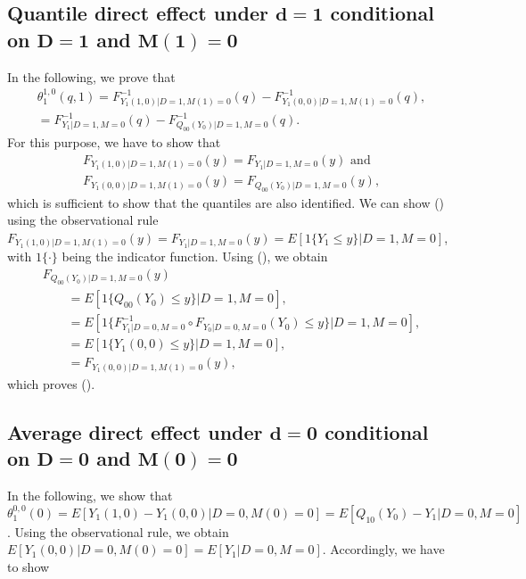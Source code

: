 \documentclass[a4paper,12pt]{article}
\begin{document}
 \doublespacing \pagestyle{plain}
\subsection{Quantile direct effect under $\mathbf{d=1}$ conditional on $\mathbf{D=1}$ and $\mathbf{M(1)=0}$}
In the following, we prove that
\begin{align*}\theta_1^{1,0}(q,1) = F_{Y_{1}(1,0)|D=1,M(1)=0}^{-1}(q)-F_{Y_{1}(0,0)|D=1,M(1)=0}^{-1}(q),\\= F_{Y_{1}|D=1,M=0}^{-1}(q)-F_{Q_{00}(Y_{0})|D=1,M=0}^{-1}(q).
\end{align*} For this purpose, we have to show that
\begin{align}
F_{Y_{1}(1,0)|D=1,M(1)=0}(y)   = F_{Y_{1}|D=1,M=0}(y) \mbox{ and}  \\
F_{Y_{1}(0,0)|D=1,M(1)=0} (y)  =F_{Q_{00}(Y_{0})|D=1,M=0}(y) ,
\end{align}
which is sufficient to show that the quantiles are also identified. We can show () using the observational rule $F_{Y_{1}(1,0)|D=1,M(1)=0}(y)= F_{Y_{1}|D=1,M=0}(y)= E[1\{Y_1 \leq y\} |D=1,M=0]$, with $1\{\cdot\}$ being the indicator function.
Using (), we obtain
\begin{equation}  \begin{array}{rl}
F_{Q_{00}(Y_{0})|D=1,M=0}(y)\\  \qquad = E[1\{Q_{00}(Y_0) \leq y \}|D=1,M=0],\\
\qquad =E[1\{ F_{Y_1|D=0,M=0}^{-1} \circ F_{Y_0|D=0,M=0}(Y_0 ) \leq y \} |D=1,M=0],\\
\qquad =E[1\{ Y_1(0,0)\leq y \}|D=1,M=0],\\ \qquad =F_{Y_{1}(0,0)|D=1,M(1)=0} (y), \end{array}
\end{equation}
which proves ().
\subsection{Average direct effect under $\mathbf{d=0}$ conditional on $\mathbf{D=0}$ and $\mathbf{M(0)=0}$}
In the following, we show that $\theta_1^{0,0}(0)= E[Y_1(1,0)-Y_1(0,0)|D=0,M(0)=0]=  E[Q_{10}(Y_0)-Y_1|D=0,M=0]$. Using the observational rule, we obtain $E[Y_1(0,0)|D=0,M(0)=0]=E[Y_1|D=0,M=0]$. Accordingly, we have to show
\end{document}
